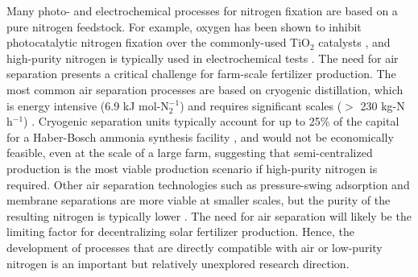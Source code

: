 Many photo- and electrochemical processes for nitrogen fixation are based on a pure nitrogen feedstock. For example, oxygen has been shown to inhibit photocatalytic nitrogen fixation over the commonly-used TiO$_2$ catalysts \cite{Hirakawa_2017}, and high-purity nitrogen is typically used in electrochemical tests \cite{Song_2018, lan2013synthesis,wang2018greening}. The need for air separation presents a critical challenge for farm-scale fertilizer production. The most common air separation processes are based on cryogenic distillation, which is energy intensive (6.9 kJ mol-N$_2^{-1}$) \cite{TANIGUCHI_2015} and requires significant scales ($>$ 230 kg-N h$^{-1}$) \cite{kirk_nitro_2005}. Cryogenic separation units typically account for up to 25\% of the capital for a Haber-Bosch ammonia synthesis facility \cite{Bartels}, and would not be economically feasible, even at the scale of a large farm, suggesting that semi-centralized production is the most viable production scenario if high-purity nitrogen is required. Other air separation technologies such as pressure-swing adsorption and membrane separations are more viable at smaller scales, but the purity of the resulting nitrogen is typically lower \cite{Smith_2001}. 
The need for air separation will likely be the limiting factor for decentralizing solar fertilizer production. Hence, the development of processes that are directly compatible with air or low-purity nitrogen is an important but relatively unexplored research direction. %

